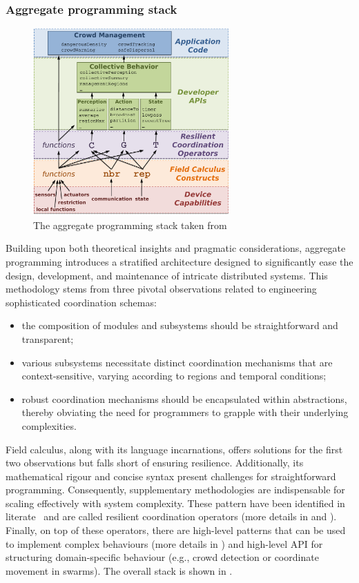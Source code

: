  \subsubsection{Aggregate programming stack}
 \begin{figure}
    \centering
    \includegraphics[width=7.5cm]{chapters/img/aggregate-programming-stack.png}
    \caption[The aggregate programming stack]{The aggregate programming stack taken from~\cite{aggregatecomputing}}\label{fig:aggregate-programming-stack}
\end{figure}
Building upon both theoretical insights and pragmatic considerations, 
 aggregate programming introduces a stratified architecture designed to significantly ease the design, development, and maintenance of intricate distributed systems. 
 This methodology stems from three pivotal observations related to engineering sophisticated coordination schemas:
\begin{itemize}
  \item the composition of modules and subsystems should be straightforward and transparent;
  \item various subsystems necessitate distinct coordination mechanisms that are context-sensitive, varying according to regions and temporal conditions;
  \item  robust coordination mechanisms should be encapsulated within abstractions, thereby obviating the need for programmers to grapple with their underlying complexities.  
\end{itemize}

Field calculus, along with its language incarnations, 
 offers solutions for the first two observations but falls short of ensuring resilience. 
 Additionally, its mathematical rigour and concise syntax present challenges for straightforward programming. 
 Consequently, supplementary methodologies are indispensable for scaling effectively with system complexity.
 These pattern have been identified in literate~\cite{aggregatecomputing} and are called resilient coordination operators (more details in  and ).
 Finally, on top of these operators, there are high-level patterns that can be used to implement complex behaviours (more details in ) and high-level API for structuring domain-specific behaviour (e.g., crowd detection or coordinate movement in swarms).
 The overall stack is shown in .

